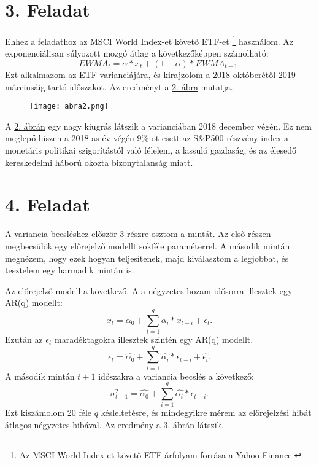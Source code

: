 \documentclass[a4paper,12pt]{article}
\begin{document}
\section{3. Feladat}
Ehhez a feladathoz az MSCI World Index-et követő ETF-et
\footnote{Az MSCI World Index-et követő ETF árfolyam forrása a  
\href{https://finance.yahoo.com/quote/XWD.TO/history/}{Yahoo Finance.}
} használom. 
Az exponenciálisan súlyozott mozgó átlag a következőképpen számolható:
\begin{equation}
EWMA_t=\alpha * x_t + (1-\alpha)*EWMA_{t-1}. 
\end{equation}
Ezt alkalmazom az ETF varianciájára, és kirajzolom a 2018 októberétől 2019 márciusáig tartó időszakot. 
Az eredményt a \hyperref[fig:fig2]{2. ábra} mutatja. 
\begin{figure}[H]
\caption{}
        \centering
        \texttt{[image: abra2.png]}
\label{fig:fig2}
\end{figure}
A \hyperref[fig:fig2]{2. ábrán} egy nagy kiugrás látszik a varianciában 2018 december végén. 
Ez nem meglepő hiszen a 2018-as év végén 9\%-ot esett az S\&P500 részvény index a monetáris politikai szigorítástól való félelem, a lassuló gazdaság, és az élesedő kereskedelmi háború okozta bizonytalanság miatt. 

\section{4. Feladat}
A variancia becsléshez először 3 részre osztom a mintát. 
Az első részen megbecsülök egy előrejelző modellt sokféle paraméterrel. 
A második mintán megnézem, hogy ezek hogyan teljesítenek, majd kiválasztom a legjobbat, és tesztelem egy harmadik mintán is. 

Az előrejelző modell a következő. 
A a négyzetes hozam idősorra illesztek egy AR(q) modellt: 
\begin{equation}
x_t=\alpha_0 + \sum_{i=1}^q \alpha_i *x_{t-i} + \epsilon_t.
\end{equation}
Ezután az $\epsilon_t$ maradéktagokra illesztek szintén egy AR(q) modellt. 
\begin{equation}
\epsilon_t=\hat{\alpha_0} + \sum_{i=1}^q \hat{\alpha_i} *\epsilon_{t-i} + \hat{\epsilon_t}.
\end{equation}
A második mintán $t+1$ időszakra a variancia becslés a következő: 
\begin{equation}
\sigma_{t+1}^2=\hat{\alpha_0} + \sum_{i=1}^q \hat{\alpha_i} *\epsilon_{t-i} .
\end{equation}
Ezt kiszámolom 20 féle $q$ késleltetésre, és mindegyikre mérem az előrejelzési hibát átlagos négyzetes hibával.  
Az eredmény a \hyperref[fig:fig3]{3. ábrán} látszik. 
\end{document}

